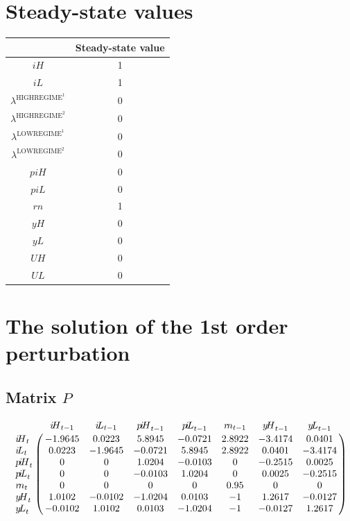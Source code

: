 

\section{Steady-state values}


\begin{tabular}{c|c|}
  & Steady-state value\\
\hline
${i\!H}$ & 1 \\
${i\!L}$ & 1 \\
$\lambda^{\mathrm{HIGHREGIME}^{\mathrm{1}}}$ & 0 \\
$\lambda^{\mathrm{HIGHREGIME}^{\mathrm{2}}}$ & 0 \\
$\lambda^{\mathrm{LOWREGIME}^{\mathrm{1}}}$ & 0 \\
$\lambda^{\mathrm{LOWREGIME}^{\mathrm{2}}}$ & 0 \\
${p\!i\!H}$ & 0 \\
${p\!i\!L}$ & 0 \\
${r\!n}$ & 1 \\
${y\!H}$ & 0 \\
${y\!L}$ & 0 \\
${U\!H}$ & 0 \\
${U\!L}$ & 0 \\
\hline
\end{tabular}


\section{The solution of the 1st order perturbation}

\subsection*{Matrix $P$}

$$\bordermatrix{
~ & {i\!H}_{t-1} & {i\!L}_{t-1} & {p\!i\!H}_{t-1} & {p\!i\!L}_{t-1} & {r\!n}_{t-1} & {y\!H}_{t-1} & {y\!L}_{t-1} \cr
{i\!H}_{t} & -1.9645 & 0.0223 & 5.8945 & -0.0721 & 2.8922 & -3.4174 & 0.0401 \cr
{i\!L}_{t} & 0.0223 & -1.9645 & -0.0721 & 5.8945 & 2.8922 & 0.0401 & -3.4174 \cr
{p\!i\!H}_{t} & 0 & 0 & 1.0204 & -0.0103 & 0 & -0.2515 & 0.0025 \cr
{p\!i\!L}_{t} & 0 & 0 & -0.0103 & 1.0204 & 0 & 0.0025 & -0.2515 \cr
{r\!n}_{t} & 0 & 0 & 0 & 0 & 0.95 & 0 & 0 \cr
{y\!H}_{t} & 1.0102 & -0.0102 & -1.0204 & 0.0103 & -1 & 1.2617 & -0.0127 \cr
{y\!L}_{t} & -0.0102 & 1.0102 & 0.0103 & -1.0204 & -1 & -0.0127 & 1.2617 \cr
}$$

